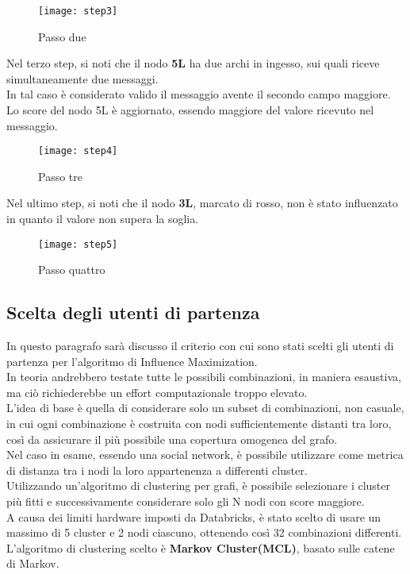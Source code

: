\begin{figure}[!htbp]
  \begin{center}
    \texttt{[image: step3]}
  	\caption{Passo due}
  	\label{step3}
  \end{center}
\end{figure}
\clearpage
Nel terzo step, si noti che il nodo \textbf{5L} ha due archi in ingesso, sui quali riceve simultaneamente
due messaggi.\\
In tal caso è considerato valido il messaggio avente il secondo campo maggiore.\\
Lo score del nodo 5L è aggiornato, essendo maggiore del valore ricevuto nel messaggio.\\
\begin{figure}[!htbp]
  \begin{center}
    \texttt{[image: step4]}
  	\caption{Passo tre}
  	\label{step4}
  \end{center}
\end{figure}
\clearpage

Nel ultimo step, si noti che il nodo \textbf{3L}, marcato di rosso, non è stato influenzato
in quanto il valore non supera la soglia.
\begin{figure}[!htbp]
  \begin{center}
    \texttt{[image: step5]}
  	\caption{Passo quattro}
  	\label{step5}
  \end{center}
\end{figure}
\clearpage
\subsection{Scelta degli utenti di partenza}
In questo paragrafo sarà discusso il criterio con cui sono stati scelti gli utenti
di partenza per l'algoritmo di Influence Maximization.\\
In teoria andrebbero testate tutte le possibili combinazioni, in maniera esaustiva,
ma ciò richiederebbe un effort computazionale troppo elevato.\\
L'idea di base è quella di considerare solo un subset di combinazioni, non casuale,
in cui ogni combinazione è costruita con nodi sufficientemente distanti
tra loro, così da assicurare il più possibile una copertura omogenea del grafo.\\
Nel caso in esame, essendo una social network, è possibile utilizzare
come metrica di distanza tra i nodi la loro appartenenza a differenti cluster.\\
Utilizzando un'algoritmo di clustering per grafi, è possibile selezionare
i cluster più fitti e successivamente considerare solo gli N nodi con score maggiore.\\
A causa dei limiti hardware imposti da Databricks, è stato scelto di usare un
massimo di 5 cluster e 2 nodi ciascuno, ottenendo così 32 combinazioni differenti.\\
L'algoritmo di clustering scelto è \textbf{Markov Cluster(MCL)}, basato sulle
catene di Markov.\\
